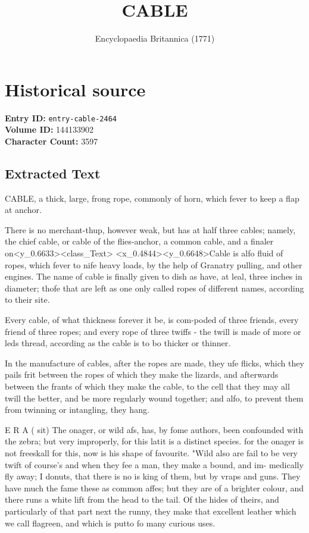 \documentclass{article}
\title{CABLE}
\date{Encyclopaedia Britannica (1771)}
\begin{document}
\maketitle

\section*{Historical source}
\textbf{Entry ID:} \texttt{entry-cable-2464} \\
\textbf{Volume ID:} 144133902 \\
\textbf{Character Count:} 3597

\subsection*{Extracted Text}
CABLE, a thick, large, frong rope, commonly of horn, which fever to keep a flap at anchor.

There is no merchant-thup, however weak, but has at half three cables; namely, the chief cable, or cable of the flies-anchor, a common cable, and a finaler on<y\_0.6633><class\_Text> <x\_0.4844><y\_0.6648>Cable is alfo fluid of ropes, which fever to nife heavy loads, by the help of Granatry pulling, and other engines. The name of cable is finally given to dish as have, at leal, three inches in diameter; thofe that are left as one only called ropes of different names, according to their site.

Every cable, of what thickness forever it be, is com-poded of three friends, every friend of three ropes; and every rope of three twiffs - the twill is made of more or leds thread, according as the cable is to bo thicker or thinner.

In the manufacture of cables, after the ropes are made, they ufe flicks, which they pails frit between the ropes of which they make the lizards, and afterwards between the frants of which they make the cable, to the cell that they may all twill the better, and be more regularly wound together; and alfo, to prevent them from twinning or intangling, they hang.

E R A ( sit) The onager, or wild afs, has, by fome authors, been confounded with the zebra; but very improperly, for this latit is a distinct species. for the onager is not freeskall for this, now is his shape of favourite. "Wild also are fail to be very twift of course’s and when they fee a man, they make a bound, and im- medically fly away; I donuts, that there is no is king of them, but by vraps and guns. They have much the fame these as common affes; but they are of a brighter colour, and there runs a white lift from the head to the tail. Of the hides of theirs, and particularly of that part next the runny, they make that excellent leather which we call flagreen, and which is putto fo many curious uses.
\end{document}
